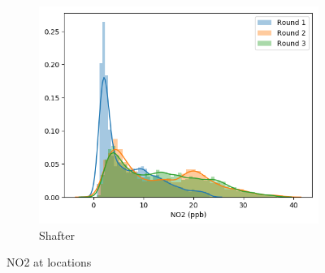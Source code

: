 \documentclass[journal abbreviation, manuscript]{copernicus}
\begin{document}
\begin{figure}[H]
\begin{subfigure}{0.32\textwidth}
\includegraphics[width=\textwidth]{results/distributions/location_shafter_no2.png}
\caption{Shafter}
\end{subfigure}
\caption{NO2 at locations}
\label{fig:no2-locations}
\end{figure}

\fi
\end{document}
